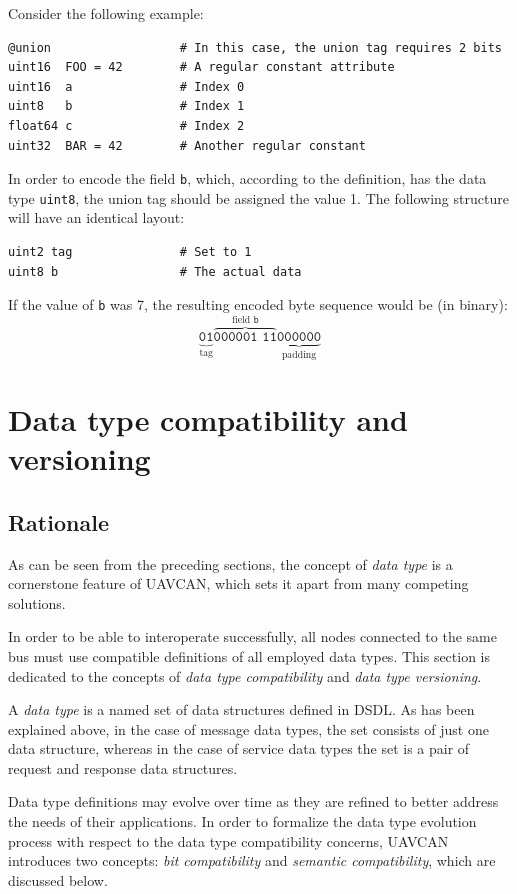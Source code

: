 Consider the following example:

\begin{verbatim}
@union                  # In this case, the union tag requires 2 bits
uint16  FOO = 42        # A regular constant attribute
uint16  a               # Index 0
uint8   b               # Index 1
float64 c               # Index 2
uint32  BAR = 42        # Another regular constant
\end{verbatim}

In order to encode the field \verb|b|, which, according to the definition,
has the data type \verb|uint8|, the union tag should be assigned the value 1.
The following structure will have an identical layout:

\begin{verbatim}
uint2 tag               # Set to 1
uint8 b                 # The actual data
\end{verbatim}

If the value of \verb|b| was 7, the resulting encoded byte sequence would be (in binary):
$$%
\underbrace{\texttt{01}}_{\text{tag}}%
\overbrace{\texttt{000001 11}}^{\text{field }\texttt{b}}%
\underbrace{\texttt{000000}}_{\text{padding}}%
$$

\section{Data type compatibility and versioning}\label{sec:dsdl_versioning}

\subsection{Rationale}

As can be seen from the preceding sections,
the concept of \emph{data type} is a cornerstone feature of UAVCAN,
which sets it apart from many competing solutions.

In order to be able to interoperate successfully,
all nodes connected to the same bus must use compatible definitions of all employed data types.
This section is dedicated to the concepts of \emph{data type compatibility}
and \emph{data type versioning}.

A \emph{data type} is a named set of data structures defined in DSDL.
As has been explained above, in the case of message data types,
the set consists of just one data structure, whereas in the case of service data types
the set is a pair of request and response data structures.

Data type definitions may evolve over time as they are refined to better address the needs of their applications.
In order to formalize the data type evolution process with respect to the data type compatibility concerns,
UAVCAN introduces two concepts: \emph{bit compatibility} and \emph{semantic compatibility},
which are discussed below.

